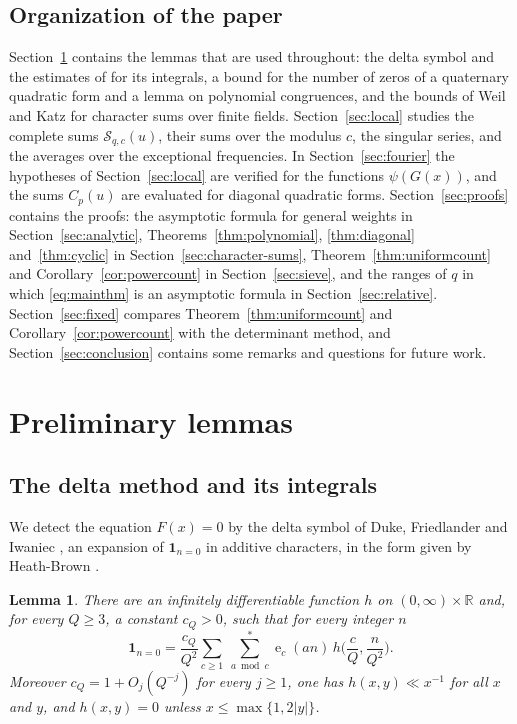 \documentclass[11pt]{amsart}
\numberwithin{equation}{section}
\numberwithin{figure}{section}
\newtheorem{lemma}{Lemma}[section]
\theoremstyle{definition}
\newcommand{\R}{\mathbb{R}}
\newcommand{\e}{\operatorname{e}}
\newcommand{\abs}[1]{\lvert #1\rvert}
\begin{document}
\subsection{Organization of the paper}\label{sec:organization}

Section~\ref{sec:lemmas} contains the lemmas that are used
throughout: the delta symbol and the estimates of \cite{HB} for its
integrals, a bound for the number of zeros of a quaternary quadratic
form and a lemma on polynomial congruences, and the bounds of Weil and Katz
for character sums over finite fields. Section~\ref{sec:local}
studies the complete sums $\mathcal S_{q,c}(u)$, their sums over the
modulus $c$, the singular series, and the averages over the
exceptional frequencies. In Section~\ref{sec:fourier} the
hypotheses of Section~\ref{sec:local} are verified for the
functions $\psi(G(x))$, and the sums $C_p(u)$ are evaluated for
diagonal quadratic forms.
Section~\ref{sec:proofs} contains the proofs: the asymptotic formula
for general weights in Section~\ref{sec:analytic},
Theorems~\ref{thm:polynomial}, \ref{thm:diagonal}
and~\ref{thm:cyclic} in Section~\ref{sec:character-sums},
Theorem~\ref{thm:uniformcount} and Corollary~\ref{cor:powercount} in
Section~\ref{sec:sieve}, and the ranges of $q$ in which
\eqref{eq:mainthm} is an asymptotic formula in
Section~\ref{sec:relative}. Section~\ref{sec:fixed} compares
Theorem~\ref{thm:uniformcount} and Corollary~\ref{cor:powercount}
with the determinant method, and Section~\ref{sec:conclusion}
contains some remarks and questions for future work.

\section{Preliminary lemmas}\label{sec:lemmas}

\subsection{The delta method and its integrals}\label{sec:delta}

We detect the equation $F(x)=0$ by the delta symbol of Duke,
Friedlander and Iwaniec \cite{DFI}, an expansion of $\mathbf 1_{n=0}$
in additive characters, in the form given by Heath-Brown \cite{HB}.

\begin{lemma}\label{lem:delta}
There are an infinitely differentiable function $h$ on
$(0,\infty)\times\R$ and, for every $Q\ge3$, a constant $c_Q>0$, such
that for every integer $n$
\begin{equation}\label{eq:delta}
 \mathbf 1_{n=0}=\frac{c_Q}{Q^2}\sum_{c\ge1}\ \sum_{a\bmod c}^{*}
 \e_c(an)\,h\Big(\frac cQ,\frac n{Q^2}\Big).
\end{equation}
Moreover $c_Q=1+O_j(Q^{-j})$ for every $j\ge1$, one has
$h(x,y)\ll x^{-1}$ for all $x$ and $y$, and $h(x,y)=0$ unless
$x\le\max\{1,2\abs y\}$.
\end{lemma}
\end{document}
